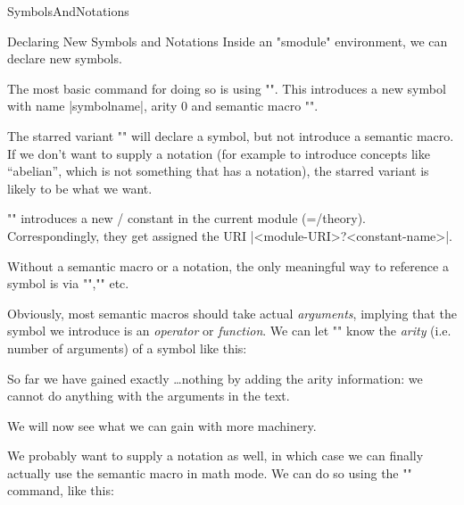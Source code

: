 \begin{smodule}[ns=https://github.com/slatex/sTeX/doc]{SymbolsAndNotations}
\begin{sfragment}{Declaring New Symbols and Notations}
    Inside an \stexcode"smodule" environment, we can declare new
    \sTeX symbols.

    \begin{function}{\symdecl}
        The most basic command for doing so is using
        \stexcode"". This introduces
        a new symbol with name |symbolname|, arity $0$ and 
        semantic macro \stexcode"\symbolname".

        The starred variant \stexcode"" will
        declare a symbol, but not introduce a semantic macro.
        If we don't want to supply a notation (for example to introduce
        concepts like ``abelian'', which is not something that
        has a notation), the starred variant is likely to be what we
        want.
    \end{function}
    \begin{mmtbox}
        \stexcode"\symdecl" introduces a new \omdoc/\mmt
        constant in the current module (=\omdoc/\mmt theory).
        Correspondingly, they get assigned the URI 
        |<module-URI>?<constant-name>|.
    \end{mmtbox}

    Without a semantic macro or a notation, the only 
    meaningful way to reference a symbol
    is via \stexcode"\symref",\stexcode"\symname" etc.


    Obviously, most semantic macros should take actual \emph{arguments},
    implying that the symbol we introduce is an \emph{operator} or
    \emph{function}. We can let \stexcode"\symdecl" know the
    \emph{arity} (i.e. number of arguments) of a symbol like this:


    So far we have gained exactly \ldots nothing by adding the arity information: we
    cannot do anything with the arguments in the text.

    We will now see what we can gain with more machinery.
    
    \begin{function}{\notation}
      We probably want to supply a notation as well, in which case we can finally actually
      use the semantic macro in math mode.  We can do so using the \stexcode"\notation"
      command, like this:
    \end{function}


\end{sfragment}
\end{smodule}
